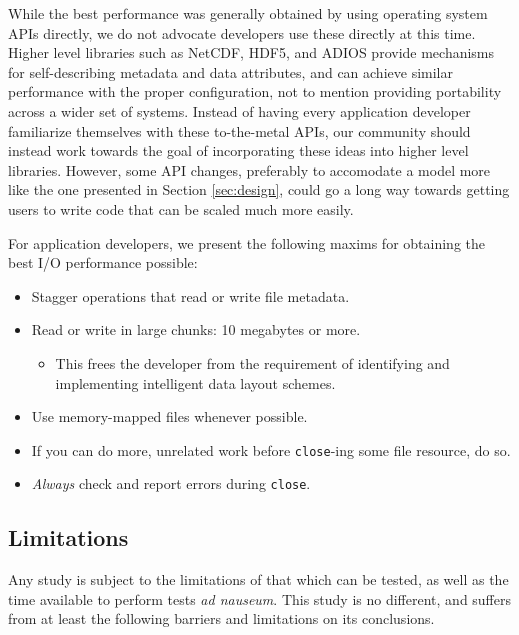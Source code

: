 While the best performance was generally obtained by using operating
system APIs directly, we do not advocate developers use these directly
at this time.  Higher level libraries such as NetCDF, HDF5, and ADIOS
provide mechanisms for self-describing metadata and data attributes,
and can achieve similar performance with the proper configuration,
not to mention providing portability across a wider set of systems.
Instead of having every application developer familiarize themselves
with these to-the-metal APIs, our community should instead work towards
the goal of incorporating these ideas into higher level libraries.
However, some API changes, preferably to accomodate a model more like
the one
presented in Section \ref{sec:design}, could go a long way towards
getting users to write code that can be scaled much more easily.

For application developers, we present the following maxims for
obtaining the best I/O performance possible:

\begin{itemize}
  \item Stagger operations that read or write file metadata.
  \item Read or write in large chunks: 10 megabytes or more.
  \begin{itemize}
    \item This frees the developer from the requirement of
    identifying and implementing intelligent data layout schemes.
  \end{itemize}
  \item Use memory-mapped files whenever possible.
  \item If you can do more, unrelated work before \verb!close!-ing some
  file resource, do so.
  \item \emph{Always} check and report errors during \verb!close!.
\end{itemize}

\subsection{Limitations}\label{sec:issues}

Any study is subject to the limitations of that which can be tested, as
well as the time available to perform tests \textit{ad nauseum}.  This
study is no different, and suffers from at least the following barriers
and limitations on its conclusions.

